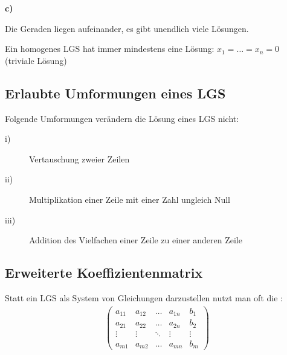\begin{samepage}
\textbf{c)}
\begin{center}
\end{center}
Die Geraden liegen aufeinander, es gibt unendlich viele Lösungen.
\end{samepage}

Ein homogenes LGS hat immer mindestens eine Lösung: $x_1 = \dots = x_n = 0$ (triviale Lösung)

\subsection{Erlaubte Umformungen eines LGS}
Folgende Umformungen verändern die Lösung eines LGS nicht:

\begin{description}
\item[i)]{Vertauschung zweier Zeilen}
\item[ii)]{Multiplikation einer Zeile mit einer Zahl ungleich Null}
\item[iii)]{Addition des Vielfachen einer Zeile zu einer anderen Zeile}
\end{description}

\subsection{Erweiterte Koeffizientenmatrix}
Statt ein LGS als System von Gleichungen darzustellen nutzt man oft die :
\begin{align*}
    \left(\begin{array}{cccc|c}
        a_{11} & a_{12} & \dots & a_{1n} & b_1 \\
        a_{21} & a_{22} & \dots & a_{2n} & b_2 \\
        \vdots & \vdots & \ddots & \vdots & \vdots \\
        a_{m1} & a_{m2} & \dots & a_{mn} & b_m
    \end{array}\right)
\end{align*}

